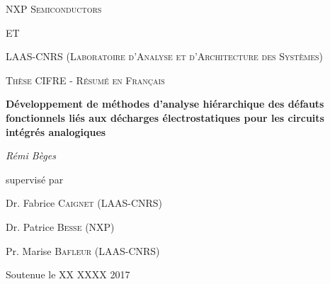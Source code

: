 \documentclass[11pt,a4paper]{book}
\title{}
\author{ \\ }
\date{Résumé en français}
\begin{document}
\begin{titlepage}
	\centering
	{\scshape NXP Semiconductors \par}
	\vspace{0.5cm}
  {\scshape ET \par}
	\vspace{0.5cm}
  {\scshape LAAS-CNRS (Laboratoire d'Analyse et d'Architecture des Systèmes) \par}
  \vspace{1cm}
	{\scshape\Large Thèse CIFRE - Résumé en Français\par}
	\vspace{1.5cm}
	{\huge\bfseries Développement de méthodes d'analyse hiérarchique des défauts fonctionnels liés aux décharges électrostatiques pour les circuits intégrés analogiques\par}
	\vspace{2cm}
	{\Large\itshape Rémi Bèges\par}
	\vfill
	supervisé par\par
	Dr. Fabrice \textsc{Caignet} (LAAS-CNRS)\par
  Dr. Patrice \textsc{Besse} (NXP)\par
  Pr. Marise \textsc{Bafleur} (LAAS-CNRS)\par

	\vfill

	{\large Soutenue le XX XXXX 2017\par}
\end{titlepage}








\tableofcontents



\printindex
\printglossary
\end{document}
